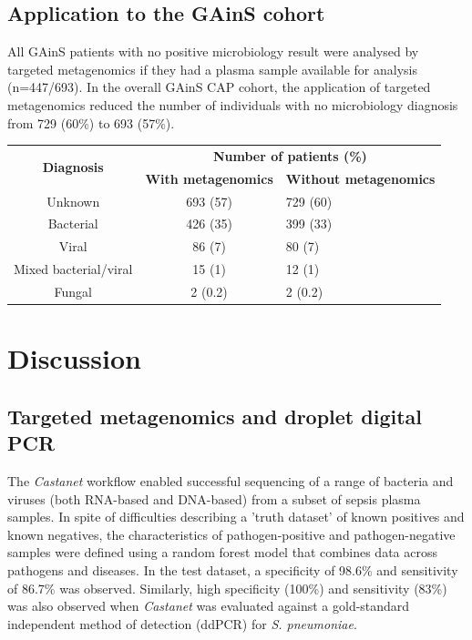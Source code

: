 \subsection{Application to the GAinS cohort}
All GAinS patients with no positive microbiology result were analysed by targeted metagenomics if they had a plasma sample available for analysis (n=447/693). In the overall GAinS CAP cohort, the application of targeted metagenomics reduced the number of individuals with no microbiology diagnosis from 729 (60\%) to 693 (57\%). 


\begin{table}[]
\begin{tabular}{|c|c|l|}
\hline
\multirow{2}{*}{\textbf{Diagnosis}} & \multicolumn{2}{c|}{\textbf{Number of patients (\%)}}      \\ \cline{2-3} 
                                    & \textbf{With metagenomics} & \textbf{Without metagenomics} \\ \hline
Unknown                             & 693 (57)                   & 729 (60)                      \\ \hline
Bacterial                           & 426 (35)                   & 399 (33)                      \\ \hline
Viral                               & 86 (7)                     & 80 (7)                        \\ \hline
Mixed bacterial/viral               & 15 (1)                     & 12 (1)                        \\ \hline
Fungal                              & 2 (0.2)                    & 2 (0.2)                       \\ \hline
\end{tabular}
\end{table}
\FloatBarrier


\section{Discussion}
\subsection{Targeted metagenomics and droplet digital PCR}
The \textit{Castanet} workflow enabled successful sequencing of a range of bacteria and viruses (both RNA-based and DNA-based) from a subset of sepsis plasma samples. In spite of difficulties describing a 'truth dataset' of known positives and known negatives, the characteristics of pathogen-positive and pathogen-negative samples were defined using a random forest model that combines data across pathogens and diseases. In the test dataset, a specificity of 98.6\% and sensitivity of 86.7\% was observed. Similarly, high specificity (100\%) and sensitivity (83\%) was also observed when \textit{Castanet} was evaluated against a gold-standard independent method of detection (ddPCR) for \textit{S. pneumoniae}.

